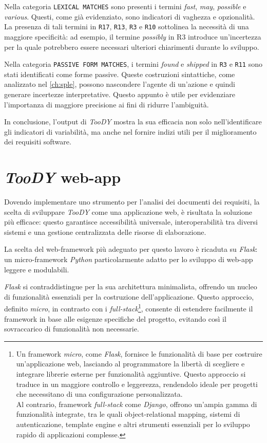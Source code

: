 \documentclass[12pt]{report}
\newcommand{\toody}{\textsl{TooDY}\xspace}
\newcommand{\python}{\textsl{Python}\xspace}
\newcommand{\flask}{\textsl{Flask}\xspace}
\newcommand{\django}{\textsl{Django}\xspace}
\begin{document}
Nella categoria \texttt{LEXICAL MATCHES} sono presenti i termini \textit{fast}, \textit{may}, \textit{possible} e \textit{various}. Questi, come già evidenziato, sono indicatori di vaghezza e opzionalità. La presenza di tali termini in \texttt{R17}, \texttt{R13}, \texttt{R3} e \texttt{R10} sottolinea la necessità di una maggiore specificità: ad esempio, il termine \textit{possibly} in R3 introduce un'incertezza per la quale potrebbero essere necessari ulteriori chiarimenti durante lo sviluppo.

Nella categoria \texttt{PASSIVE FORM MATCHES}, i termini \textit{found} e \textit{shipped} in \texttt{R3} e \texttt{R11} sono stati identificati come forme passive. Queste costruzioni sintattiche, come analizzato nel \cref{ch:sple}, possono nascondere l'agente di un'azione e quindi generare incertezze interpretative. Questo appunto è utile per evidenziare l'importanza di maggiore precisione ai fini di ridurre l'ambiguità.

In conclusione, l'output di \toody mostra la sua efficacia non solo nell'identificare gli indicatori di variabilità, ma anche nel fornire indizi utili per il miglioramento dei requisiti software.






\chapter{\toody web-app}
\label{ch:architettura}
Dovendo implementare uno strumento per l'analisi dei documenti dei requisiti, la scelta di sviluppare \toody come una applicazione web, è risultata la soluzione più efficace: questo garantisce accessibilità universale, interoperabilità tra diversi sistemi e una gestione centralizzata delle risorse di elaborazione.

La scelta del web-framework più adeguato per questo lavoro è ricaduta su \flask: un micro-framework \python particolarmente adatto per lo sviluppo di web-app leggere e modulabili.

\flask si contraddistingue per la sua architettura minimalista, offrendo un nucleo di funzionalità essenziali per la costruzione dell'applicazione. Questo approccio, definito \textit{micro}, in contrasto con i \textit{full-stack}\footnote{Un framework \textit{micro}, come \flask, fornisce le funzionalità di base per costruire un'applicazione web, lasciando al programmatore la libertà di scegliere e integrare librerie esterne per funzionalità aggiuntive. Questo approccio si traduce in un maggiore controllo e leggerezza, rendendolo ideale per progetti che necessitano di una configurazione personalizzata.\\
Al contrario, framework \textit{full-stack} come \django, offrono un'ampia gamma di funzionalità integrate, tra le quali object-relational mapping, sistemi di autenticazione, template engine e altri strumenti essenziali per lo sviluppo rapido di applicazioni complesse.}, consente di estendere facilmente il framework in base alle esigenze specifiche del progetto, evitando così il sovraccarico di funzionalità non necessarie.
\end{document}
